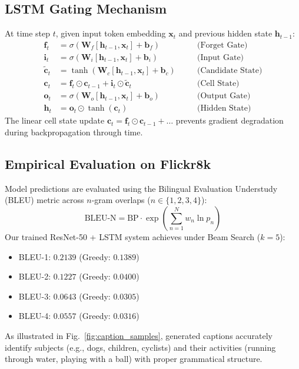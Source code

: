 \documentclass[conference]{IEEEtran}
\begin{document}
\subsection{LSTM Gating Mechanism}
At time step $t$, given input token embedding $\mathbf{x}_t$ and previous hidden state $\mathbf{h}_{t-1}$:
\begin{align}
\mathbf{f}_t &= \sigma(\mathbf{W}_f [\mathbf{h}_{t-1}, \mathbf{x}_t] + \mathbf{b}_f) \quad &&\text{(Forget Gate)} \\
\mathbf{i}_t &= \sigma(\mathbf{W}_i [\mathbf{h}_{t-1}, \mathbf{x}_t] + \mathbf{b}_i) \quad &&\text{(Input Gate)} \\
\tilde{\mathbf{c}}_t &= \tanh(\mathbf{W}_c [\mathbf{h}_{t-1}, \mathbf{x}_t] + \mathbf{b}_c) \quad &&\text{(Candidate State)} \\
\mathbf{c}_t &= \mathbf{f}_t \odot \mathbf{c}_{t-1} + \mathbf{i}_t \odot \tilde{\mathbf{c}}_t \quad &&\text{(Cell State)} \\
\mathbf{o}_t &= \sigma(\mathbf{W}_o [\mathbf{h}_{t-1}, \mathbf{x}_t] + \mathbf{b}_o) \quad &&\text{(Output Gate)} \\
\mathbf{h}_t &= \mathbf{o}_t \odot \tanh(\mathbf{c}_t) \quad &&\text{(Hidden State)}
\end{align}
The linear cell state update $\mathbf{c}_t = \mathbf{f}_t \odot \mathbf{c}_{t-1} + \dots$ prevents gradient degradation during backpropagation through time.

\subsection{Empirical Evaluation on Flickr8k}
Model predictions are evaluated using the Bilingual Evaluation Understudy (BLEU) metric across $n$-gram overlaps ($n \in \{1, 2, 3, 4\}$):
\begin{equation}
\text{BLEU-N} = \text{BP} \cdot \exp \left( \sum_{n=1}^N w_n \ln p_n \right)
\end{equation}
Our trained ResNet-50 + LSTM system achieves under Beam Search ($k=5$):
\begin{itemize}
    \item BLEU-1: $0.2139$ (Greedy: $0.1389$)
    \item BLEU-2: $0.1227$ (Greedy: $0.0400$)
    \item BLEU-3: $0.0643$ (Greedy: $0.0305$)
    \item BLEU-4: $0.0557$ (Greedy: $0.0316$)
\end{itemize}
As illustrated in Fig.~\ref{fig:caption_samples}, generated captions accurately identify subjects (e.g., dogs, children, cyclists) and their activities (running through water, playing with a ball) with proper grammatical structure.
\end{document}
